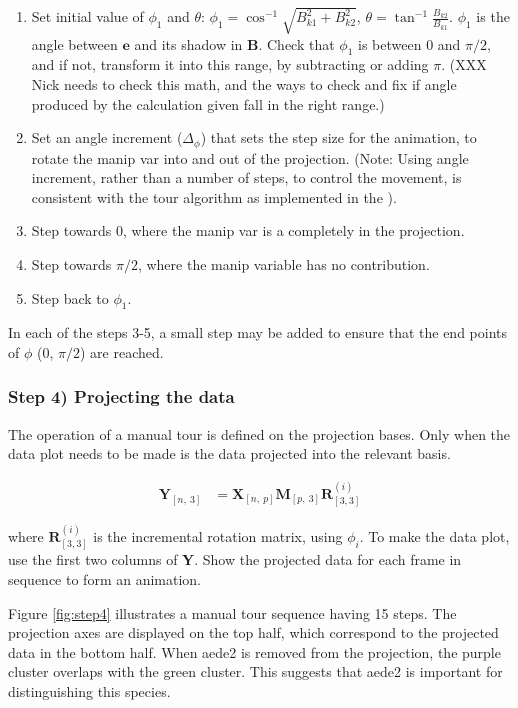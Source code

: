 \begin{enumerate}
\def\labelenumi{\arabic{enumi}.}
\tightlist
\item
  Set initial value of \(\phi_1\) and \(\theta\):
  \(\phi_1 = \cos^{-1}{\sqrt{B_{k1}^2+B_{k2}^2}}\),
  \(\theta=\tan^{-1}\frac{B_{k2}}{B_{k1}}\). \(\phi_1\) is the angle
  between \(\textbf{e}\) and its shadow in \(\textbf{B}\). Check that
  \(\phi_1\) is between 0 and \(\pi/2\), and if not, transform it into
  this range, by subtracting or adding \(\pi\). (XXX Nick needs to check
  this math, and the ways to check and fix if angle produced by the
  calculation given fall in the right range.)
\item
  Set an angle increment (\(\Delta_\phi\)) that sets the step size for
  the animation, to rotate the manip var into and out of the projection.
  (Note: Using angle increment, rather than a number of steps, to
  control the movement, is consistent with the tour algorithm as
  implemented in the ).
\item
  Step towards \(0\), where the manip var is a completely in the
  projection.
\item
  Step towards \(\pi/2\), where the manip variable has no contribution.
\item
  Step back to \(\phi_1\).
\end{enumerate}

In each of the steps 3-5, a small step may be added to ensure that the
end points of \(\phi\) (0, \(\pi/2\)) are reached.

\hypertarget{sec:display}{%
\subsubsection{Step 4) Projecting the data}\label{sec:display}}

The operation of a manual tour is defined on the projection bases. Only
when the data plot needs to be made is the data projected into the
relevant basis.

\begin{align*}
  \textbf{Y}_{[n,~3]} &= \textbf{X}_{[n,~p]} \textbf{M}_{[p,~3]} \textbf{R}^{(i)}_{[3,3]}
\end{align*}

\noindent where \(\textbf{R}^{(i)}_{[3,3]}\) is the incremental rotation
matrix, using \(\phi_i\). To make the data plot, use the first two
columns of \textbf{Y}. Show the projected data for each frame in
sequence to form an animation.

Figure \ref{fig:step4} illustrates a manual tour sequence having 15
steps. The projection axes are displayed on the top half, which
correspond to the projected data in the bottom half. When aede2 is
removed from the projection, the purple cluster overlaps with the green
cluster. This suggests that aede2 is important for distinguishing this
species.

